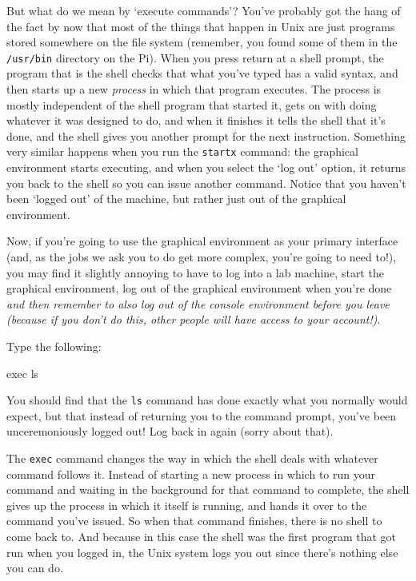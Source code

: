 But what do we mean by `execute commands'? You've probably got the hang of the fact by now that most of the things that happen in Unix are just programs stored somewhere on the file system (remember, you found some of them in the \texttt{/usr/bin} directory on the Pi). When you press return at a shell prompt, the program that is the shell checks that what you've typed has a valid syntax, and then starts up a new \textit{process} in which that program executes. The process is mostly independent of the shell program that started it, gets on with doing whatever it was designed to do, and when it finishes it tells the shell that it's done, and the shell gives you another prompt for the next instruction. Something very similar happens when you run the \texttt{startx} command: the graphical environment starts executing, and when you select the `log out' option, it returns you back to the shell so you can issue another command. Notice that you haven't been `logged out' of the machine, but rather just out of the graphical environment. 

Now, if you're going to use the graphical environment as your primary interface (and, as the jobs we ask you to do get more complex, you're going to need to!), you may find it slightly annoying to have to log into a lab machine, start the graphical environment, log out of the graphical environment when you're done \textit{and then remember to also log out of the console environment before you leave (because if you don't do this, other people will have access to your account!)}. 

Type the following:

\begin{ttoutenv}
exec ls
\end{ttoutenv}

You should find that the \texttt{ls} command has done exactly what you normally would expect, but that instead of returning you to the command prompt, you've been unceremoniously logged out! Log back in again (sorry about that). 

The \texttt{exec} command changes the way in which the shell deals with whatever command follows it. Instead of starting a new process in which to run your command and waiting in the background for that command to complete, the shell gives up the process in which it itself is running, and hands it over to the command you've issued. So when that command finishes, there is no shell to come back to. And because in this case the shell was the first program that got run when you logged in, the Unix system logs you out since there's nothing else you can do. 

